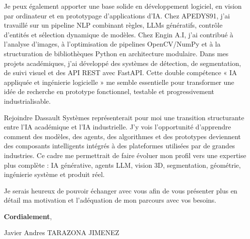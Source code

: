 \documentclass[10pt,a4paper]{article}
\begin{document}
{Je peux également apporter une base solide en développement logiciel, en vision par ordinateur et en prototypage d’applications d’IA. Chez APEDYS91, j’ai travaillé sur un pipeline NLP combinant règles, LLMs génératifs, contrôle d’entités et sélection dynamique de modèles. Chez Engin A.I, j’ai contribué à l’analyse d’images, à l’optimisation de pipelines OpenCV/NumPy et à la structuration de bibliothèques Python en architecture modulaire. Dans mes projets académiques, j’ai développé des systèmes de détection, de segmentation, de suivi visuel et des API REST avec FastAPI. Cette double compétence « IA appliquée et ingénierie logicielle » me semble essentielle pour transformer une idée de recherche en prototype fonctionnel, testable et progressivement industrialisable.

Rejoindre Dassault Systèmes représenterait pour moi une transition structurante entre l’IA académique et l’IA industrielle. J’y vois l’opportunité d’apprendre comment des modèles, des agents, des algorithmes et des prototypes deviennent des composants intelligents intégrés à des plateformes utilisées par de grandes industries. Ce cadre me permettrait de faire évoluer mon profil vers une expertise plus complète : IA générative, agents LLM, vision 3D, segmentation, géométrie, ingénierie système et produit réel.

Je serais heureux de pouvoir échanger avec vous afin de vous présenter plus en détail ma motivation et l’adéquation de mon parcours avec vos besoins.

\textbf{Cordialement},

Javier Andres TARAZONA JIMENEZ


}
\end{document}
